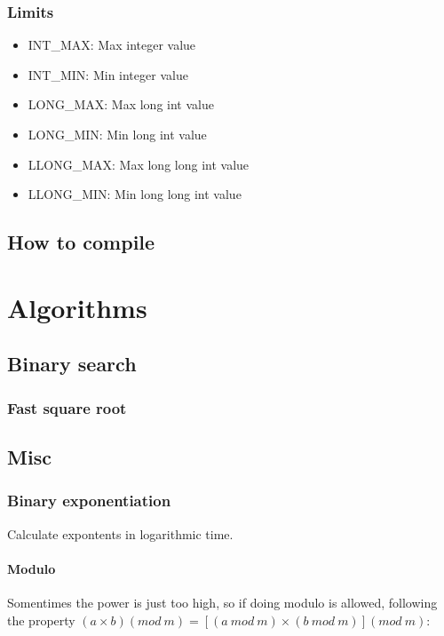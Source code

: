 \documentclass[a4paper,10pt,twocolumn, titlepage]{article}
\begin{document}
\subsubsection{Limits}

\begin{itemize}
 \item INT\_MAX: Max integer value
 \item INT\_MIN: Min integer value
 \item LONG\_MAX: Max long int value
 \item LONG\_MIN: Min long int value
 \item LLONG\_MAX: Max long long int value
 \item LLONG\_MIN: Min long long int value
\end{itemize}

\subsection{How to compile}





\section{Algorithms} %
\subsection{Binary search}

\subsubsection{Fast square root}

\subsection{Misc}
\subsubsection{Binary exponentiation}
Calculate expontents in logarithmic time.



\paragraph{Modulo} Somentimes the power is just too high, so if doing modulo is allowed, following the property $(a\times b) (mod~m)=[(a~mod~m)\times(b~mod~m)](mod~m)$:
\end{document}
